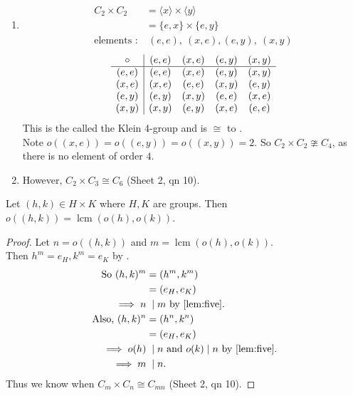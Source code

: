 \begin{example} \mbox{}
  \begin{enumerate}
    \item 
      \begin{align*}
        C_2 \times C_2 &= \langle x \rangle \times \langle y \rangle \\
        &= \{ e, x \} \times \{e, y\} \\
        \text{elements :} &\ (e, e),\ (x, e), (e, y),\ (x, y)
      \end{align*} 
      \begin{align*}
        \begin{array}{c | cccc}
          \circ & (e, e) & (x, e) & (e, y) & (x, y) \\
          \hline
          (e, e) & (e, e) & (x, e) & (e, y) & (x, y) \\
          (x, e) & (x, e) & (e, e) & (x, y) & (e, y) \\
          (e, y) & (e, y) & (x, y) & (e, e) & (x, e) \\
          (x, y) & (x, y) & (e, y) & (x, e) & (e, e)
        \end{array}
      \end{align*} 
      This is the called the Klein 4-group and is $\cong$ to .\\
      Note $o\left( (x, e) \right) = o\left( (e, y) \right) = o\left( (x, y) \right) = 2$. So $C_2 \times C_2 \ncong C_4$, as there is no element of order $4$.
    \item However, $C_2 \times C_3 \cong C_6$ (Sheet 2, qn 10).
  \end{enumerate} 
\end{example} 

\begin{lemma}
    Let $(h, k) \in H \times K$ where $H, K$ are groups. 
    Then $o\left( (h, k) \right) = \operatorname{lcm} \left( o(h), o(k) \right)$.
\end{lemma} 

\begin{proof}
  Let $n = o\left( (h, k) \right)$ and $m = \operatorname{lcm} \left( o(h), o(k) \right)$.\\
  Then $h^m = e_H, k^m = e_K$ by .
  \begin{align*}
    \text{So } (h, k)^m &= (h^m, k^m) \\
    &= (e_H, e_K) \\
    \implies n &\;\mid m \text{ by \Cref{lem:five}}. \\
    \text{Also, } (h, k)^n &= (h^n, k^n) \\
    &= (e_H, e_K) \\
    \implies o(h) &\;\mid n \text{ and } o(k) \mid n \text{ by \Cref{lem:five}}. \\
    \implies m &\;\mid n.
  \end{align*} 
  Thus we know when $C_m \times C_n \cong C_{mn}$ (Sheet 2, qn 10).
\end{proof} 


